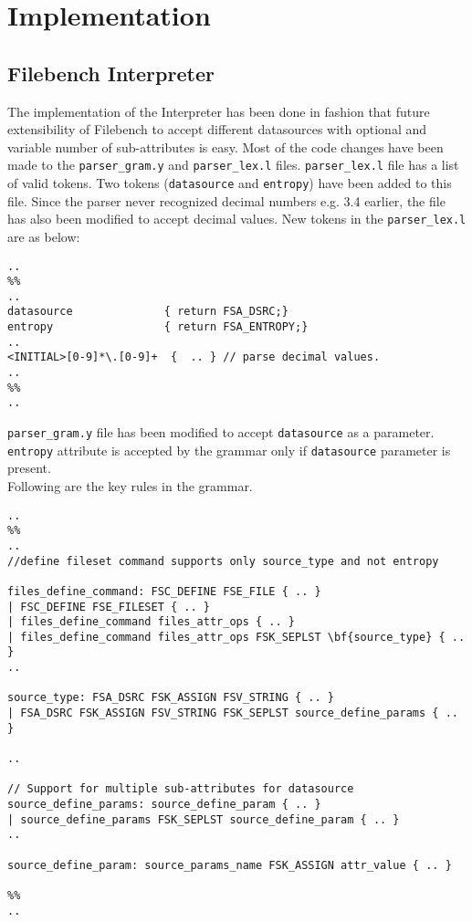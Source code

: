 \chapter{Implementation}\label{chap:imp}

\section{Filebench Interpreter}
The implementation of the Interpreter has been done in fashion that future extensibility of Filebench to accept different datasources with optional and variable number of sub-attributes is easy. Most of the code changes have been made to the \verb+parser_gram.y+ and \verb+parser_lex.l+ files. \verb+parser_lex.l+ file has a list of valid tokens. Two tokens (\verb+datasource+ and \verb+entropy+) have been added to this file. Since the parser never recognized decimal numbers e.g. 3.4 earlier, the file has also been modified to accept decimal values. New tokens in the \verb+parser_lex.l+ are as below:
\lstset{language=C}
\begin{lstlisting}
..
%%
..
datasource              { return FSA_DSRC;}
entropy                 { return FSA_ENTROPY;}
..
<INITIAL>[0-9]*\.[0-9]+  {  .. } // parse decimal values.
..
%%
..
\end{lstlisting}

\noindent \verb+parser_gram.y+ file has been modified to accept \verb+datasource+ as a parameter. \verb+entropy+ attribute is accepted by the grammar only if \verb+datasource+ parameter is present.\\ Following are the key rules in the grammar.
\lstset{language=C}
\begin{lstlisting}
..
%%
..
//define fileset command supports only source_type and not entropy

files_define_command: FSC_DEFINE FSE_FILE { .. }
| FSC_DEFINE FSE_FILESET { .. }
| files_define_command files_attr_ops { .. }
| files_define_command files_attr_ops FSK_SEPLST \bf{source_type} { .. }     
..

source_type: FSA_DSRC FSK_ASSIGN FSV_STRING { .. }
| FSA_DSRC FSK_ASSIGN FSV_STRING FSK_SEPLST source_define_params { .. } 	

..

// Support for multiple sub-attributes for datasource
source_define_params: source_define_param { .. }
| source_define_params FSK_SEPLST source_define_param { .. }	        
..

source_define_param: source_params_name FSK_ASSIGN attr_value { .. }

%%
..
\end{lstlisting}


